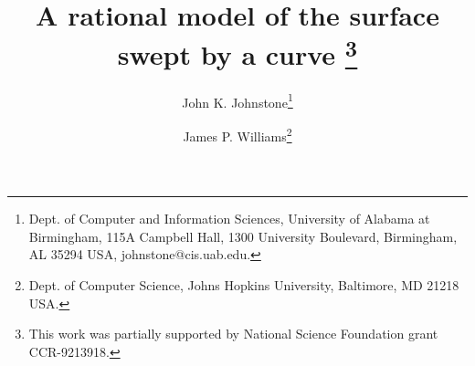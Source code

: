 \newcommand{\SingleSpace}{\edef\baselinestretch{0.9}\Large\normalsize}
\newcommand{\DoubleSpace}{\edef\baselinestretch{1.4}\Large\normalsize}
\newcommand{\Comment}[1]{\relax}  %
\newcommand{\Heading}[1]{\par\noindent{\bf#1}\nobreak}
\newcommand{\Tail}[1]{\nobreak\par\noindent{\bf#1}}
\newcommand{\QED}{\vrule height 1.4ex width 1.0ex depth -.1ex\ } %
\newcommand{\arc}[1]{\mbox{$\stackrel{\frown}{#1}$}}
\newcommand{\lyne}[1]{\mbox{$\stackrel{\leftrightarrow}{#1}$}}
\newcommand{\ray}[1]{\mbox{$\vec{#1}$}}          
\newcommand{\seg}[1]{\mbox{$\overline{#1}$}}
\newcommand{\tab}{\hspace*{.2in}}
\newcommand{\se}{\mbox{$_{\epsilon}$}}  %
\newcommand{\ie}{\mbox{i.e.}}
\newcommand{\eg}{\mbox{e.\ g.\ }}
\newcommand{\figg}[3]{\begin{figure}[htbp]\vspace{#3}\caption{#2}\label{#1}\end{figure}}
\newcommand{\be}{\begin{equation}}
\newcommand{\ee}{\end{equation}}
\newcommand{\prf}{\noindent{{\bf Proof} :\ }}
\newcommand{\choice}[2]{\left( \begin{array}{c} \mbox{\footnotesize{$#1$}} \\ \mbox{\footnotesize{$#2$}} \end{array} \right)}      
\newcommand{\ddt}{\frac{\partial}{\partial t}}

\newtheorem{rmk}{Remark}[section]
\newtheorem{example}{Example}[section]
\newtheorem{conjecture}{Conjecture}[section]
\newtheorem{claim}{Claim}[section]
\newtheorem{notation}{Notation}[section]
\newtheorem{lemma}{Lemma}[section]
\newtheorem{theorem}{Theorem}[section]
\newtheorem{corollary}{Corollary}[section]
\newtheorem{defn2}{Definition}


\pagestyle{empty}

\setlength{\oddsidemargin}{2mm}
\setlength{\evensidemargin}{2mm}
\setlength{\headsep}{0pt}
\setlength{\topmargin}{0pt}
\setlength{\textheight}{216mm}
\setlength{\textwidth}{156mm}

\title{A rational model of the surface swept by a curve
        \thanks{This work was partially supported by 
	National Science Foundation grant CCR-9213918.}}
\author{John K. Johnstone\thanks{Dept. of Computer and Information Sciences,
	University of Alabama at Birmingham, 115A Campbell Hall,
	1300 University Boulevard, Birmingham, AL 35294 USA, 
	johnstone@cis.uab.edu.}
	\and James P. Williams\thanks{Dept. of Computer Science,
 	Johns Hopkins University, Baltimore, MD 21218 USA.}}


